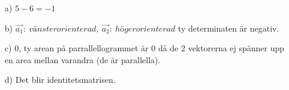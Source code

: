 \begin{itemize}
	\item[a) ] $5-6=-1$
	\item[b) ] $\vec{a_1}:\ vänsterorienterad,\ \vec{a_2}:\ högerorienterad$ ty determinaten är negativ.
	\item[c) ] 0, ty arean på parrallellogrammet är 0 då de 2 vektorerna ej spänner upp en area mellan varandra (de är parallella).
	\item[d) ] Det blir identitetsmatrisen.
\end{itemize}